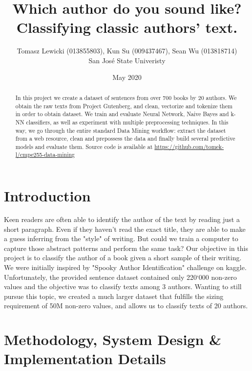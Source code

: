 \documentclass[journal,12pt,onecolumn]{IEEEtran}
\title{Which author do you sound like? \\ Classifying classic authors’ text. }
\author{Tomasz Lewicki (013855803), Kun Su (009437467), Sean Wu (013818714) \\ San Jos{\'e} State Univeristy}
\date{May 2020}
\begin{document}
\maketitle

\begin{abstract}
\noindent In this project we create a dataset of sentences from over 700 books by 20 authors. We obtain the raw texts from Project Gutenberg\cite{gutenberg}, and clean, vectorize and tokenize them in order to obtain dataset. We train and evaluate Neural Network, Naive Bayes and k-NN classifiers, as well as experiment with multiple preprocessing techniques. In this way, we go through the entire standard Data Mining workflow: extract the dataset from a web resource, clean and prepossess the data and finally build several predictive models and evaluate them. Source code is available at \url{https://github.com/tomek-l/cmpe255-data-mining}
\end{abstract}

\section{Introduction}

Keen readers are often able to identify the author of the text by reading just a short paragraph. Even if they haven't read the exact title, they are able to make a guess inferring from the "style" of writing. But could we train a computer to capture those abstract patterns and perform the same task? Our objective in this project is to classify the author of a book given a short sample of their writing. We were initially inspired by "Spooky Author Identification" challenge\cite{spooky} on kaggle. Unfortunately, the provided sentence dataset contained only 220`000 non-zero values and the objective was to classify texts among 3 authors. Wanting to still pursue this topic, we created a much larger dataset that fulfills the sizing requirement of 50M non-zero values, and allows us to classify texts of 20 authors.


\section{Methodology, System Design \& Implementation Details}

\end{document}
